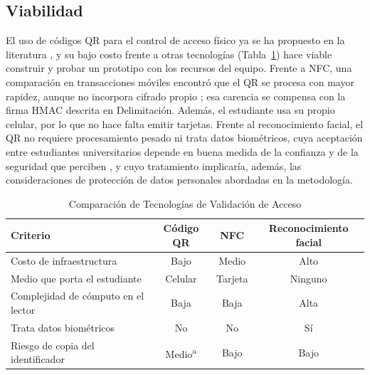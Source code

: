 \subsection{Viabilidad}
El uso de códigos QR para el control de acceso físico ya se ha propuesto en
la literatura \parencite{kao2011physical}, y su bajo costo frente a otras
tecnologías (Tabla~\ref{tab:comparativa}) hace viable construir y probar un
prototipo con los recursos del equipo. Frente a NFC, una comparación en
transacciones móviles encontró que el QR se procesa con mayor rapidez, aunque
no incorpora cifrado propio \parencite{harnaningrum2024comparison}; esa
carencia se compensa con la firma HMAC descrita en Delimitación. Además, el
estudiante usa su propio celular, por lo que no hace falta emitir tarjetas.
Frente al reconocimiento facial, el QR no requiere procesamiento pesado ni
trata datos biométricos, cuya aceptación entre estudiantes universitarios
depende en buena medida de la confianza y de la seguridad que perciben
\parencite{rukhiran2023user}, y cuyo tratamiento implicaría, además, las
consideraciones de protección de datos personales abordadas en la metodología.

\begin{table}[tbp]
	\caption{Comparación de Tecnologías de Validación de Acceso}
	\label{tab:comparativa}
	\begin{tabular}{lccc}
		\toprule
		Criterio                            & Código QR                & NFC     & Reconocimiento facial \\
		\midrule
		Costo de infraestructura            & Bajo                     & Medio   & Alto                  \\
		Medio que porta el estudiante       & Celular                  & Tarjeta & Ninguno               \\
		Complejidad de cómputo en el lector & Baja                     & Baja    & Alta                  \\
		Trata datos biométricos             & No                       & No      & Sí                    \\
		Riesgo de copia del identificador   & Medio\textsuperscript{a} & Bajo    & Bajo                  \\
		\bottomrule
	\end{tabular}
\end{table}

